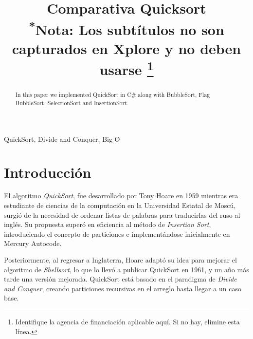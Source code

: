 \documentclass[conference]{IEEEtran}
\begin{document}
\title{Comparativa Quicksort\\
{\footnotesize \textsuperscript{*}Nota: Los subtítulos no son capturados en Xplore y
no deben usarse}%
\thanks{Identifique la agencia de financiación aplicable aquí. Si no hay, elimine esta línea.}}

\author{
\and
{}
}

\maketitle

\begin{abstract}
In this paper we implemented QuickSort in C# along with BubbleSort, Flag BubbleSort, SelectionSort and InsertionSort.
\end{abstract}

\begin{IEEEkeywords}
QuickSort, Divide and Conquer, Big O
\end{IEEEkeywords}


\section{Introducción}

El algoritmo \textit{QuickSort}, fue desarrollado por Tony Hoare en 1959 mientras era estudiante de ciencias de la computación en la Universidad Estatal de Moscú, 
surgió de la necesidad de ordenar listas de palabras para traducirlas del ruso al inglés. 
Su propuesta superó en eficiencia al método de \textit{Insertion Sort}, introduciendo el concepto de particiones e implementándose inicialmente en Mercury Autocode. 

Posteriormente, al regresar a Inglaterra, Hoare adaptó su idea para mejorar el algoritmo de \textit{Shellsort}, lo que lo llevó a publicar QuickSort en 1961, y un año más tarde una versión mejorada. QuickSort está basado en el paradigma de \textit{Divide and Conquer}, creando particiones recursivas en el arreglo hasta llegar a un caso base. 
\end{document}
